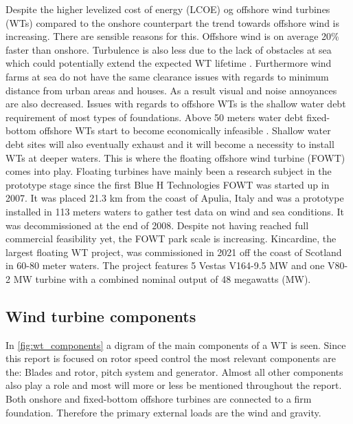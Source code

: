 Despite the higher levelized cost of energy (LCOE) og offshore wind turbines (WTs) compared to the onshore counterpart the trend towards offshore wind is increasing. There are sensible reasons for this. Offshore wind is on average 20\% faster than onshore. Turbulence is also less due to the lack of obstacles at sea which could potentially extend the expected WT lifetime \cite{Christiansen2013}. Furthermore wind farms at sea do not have the same clearance issues with regards to minimum distance from urban areas and houses. As a result visual and noise annoyances are also decreased. Issues with regards to offshore WTs is the shallow water debt requirement of most types of foundations. Above 50 meters water debt fixed-bottom offshore WTs start to become economically infeasible \cite{Lefebvre2012}. Shallow water debt sites will also eventually exhaust and it will become a necessity to install WTs at deeper waters. This is where the floating offshore wind turbine (FOWT) comes into play. Floating turbines have mainly been a research subject in the prototype stage since the first Blue H Technologies FOWT was started up in 2007. It was placed 21.3 km from the coast of Apulia, Italy and was a prototype installed in 113 meters waters to gather test data on wind and sea conditions. It was decommissioned at the end of 2008. Despite not having reached full commercial feasibility yet, the FOWT park scale is increasing. Kincardine, the largest floating WT project, was commissioned in 2021 off the coast of Scotland in 60-80 meter waters. The project features 5 Vestas V164-9.5 MW and one V80-2 MW turbine with a combined nominal output of 48 megawatts (MW). 

\subsection{Wind turbine components}
In \cref{fig:wt_components} a digram of the main components of a WT is seen. Since this report is focused on rotor speed control the most relevant components are the: Blades and rotor, pitch system and generator. Almost all other components also play a role and most will more or less be mentioned throughout the report. Both onshore and fixed-bottom offshore turbines are connected to a firm foundation. Therefore the primary external loads are the wind and gravity. 

